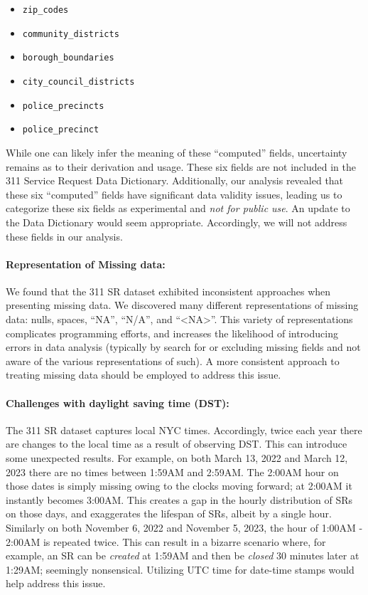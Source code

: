 \documentclass[linenumber]{jdsart}
\begin{document}
\begin{itemize}[left=1.5em]
    \item \texttt{zip\_codes}
    \item \texttt{community\_districts}
    \item \texttt{borough\_boundaries}
    \item \texttt{city\_council\_districts}
    \item \texttt{police\_precincts}
    \item \texttt{police\_precinct}
\end{itemize}

While one can likely infer the meaning of these ``computed'' 
fields, uncertainty remains as to their derivation and 
usage. These six fields are not included in
the 311 Service Request Data Dictionary. Additionally, our analysis 
revealed that these six ``computed'' fields have 
significant data validity issues, leading us to categorize these six fields 
as experimental and \textit{not for public use}. An update 
to the Data Dictionary would seem appropriate. Accordingly, 
we will not address these fields in our analysis. 

\paragraph{Representation of Missing data:} We found that the 
311 SR dataset exhibited inconsistent approaches when 
presenting missing data. We discovered many different 
representations of missing data: nulls, spaces, ``NA'', ``N/A'', 
and ``<NA>''. This variety of representations complicates programming
efforts, and increases the likelihood of introducing errors 
in data analysis (typically by search for or excluding missing fields 
and not aware of the various representations of such). A more consistent 
approach to treating missing data should be employed to address this issue.

\paragraph{Challenges with daylight saving time (DST):} The 311 SR 
dataset captures local NYC times. Accordingly, twice each 
year there are changes to the local time as a result of observing 
DST. This can introduce some unexpected results. For example, 
on both March 13, 2022 and March 12, 2023 there are no times 
between 1:59AM and 2:59AM. The 2:00AM hour on those dates 
is simply missing owing to the clocks moving forward; at 2:00AM 
it instantly becomes 3:00AM. This creates a gap in the hourly 
distribution of SRs on those days, and exaggerates the 
lifespan of SRs, albeit by a single hour. Similarly on both
November 6, 2022 and November 5, 2023, the 
hour of 1:00AM - 2:00AM is repeated twice. This can result 
in a bizarre scenario where, for example, an SR can 
be \textit{created} at 1:59AM and then be \textit{closed} 30 minutes later 
at 1:29AM; seemingly nonsensical. Utilizing UTC time 
for date-time stamps would help address this issue.
\end{document}
